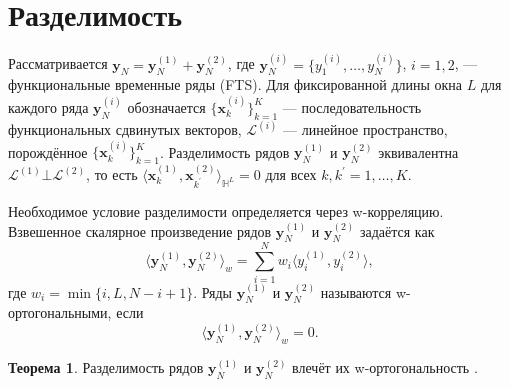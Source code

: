 \documentclass[12pt, specialist, subf
]{disser}
\theoremstyle{definition}
\newtheorem{theorem}{Теорема} %
\begin{document}
\section{Разделимость}\label{subsec: Separability}

Рассматривается $\textbf{y}_N=\textbf{y}_N^{(1)}+\textbf{y}_N^{(2)}$, где $\textbf{y}_N^{(i)}=\{y_1^{(i)},\ldots,y_N^{(i)}\}$, $i=1,2$, — функциональные временные ряды (FTS). Для фиксированной длины окна $L$ для каждого ряда $\textbf{y}_N^{(i)}$ обозначается $\{{\pmb x}_{k}^{(i)}\}_{k=1}^K$ — последовательность функциональных сдвинутых векторов, $\mathcal{L}^{(i)}$ — линейное пространство, порождённое $\{{\pmb x}_{k}^{(i)}\}_{k=1}^K$. Разделимость рядов $\textbf{y}_N^{(1)}$ и $\textbf{y}_N^{(2)}$ эквивалентна $\mathcal{L}^{(1)}\bot\mathcal{L}^{(2)}$, то есть $\langle {\pmb x}_{k}^{(1)},{\pmb x}_{k^\prime}^{(2)}\rangle_{\mathbb{H}^L}=0$ для всех $k,k^\prime=1,\ldots,K$.

Необходимое условие разделимости определяется через w-корреляцию. Взвешенное скалярное произведение рядов $\textbf{y}_N^{(1)}$ и $\textbf{y}_N^{(2)}$ задаётся как
\begin{equation}\label{winn}
	\langle \textbf{y}_N^{(1)},\textbf{y}_N^{(2)}\rangle_w=\sum_{i=1}^N w_i \langle y_i^{(1)},y_i^{(2)}\rangle,
\end{equation}
где $w_i=\min\{i,L,N-i+1\}$. Ряды $\textbf{y}_N^{(1)}$ и $\textbf{y}_N^{(2)}$ называются w-ортогональными, если
\begin{equation}
	\langle \textbf{y}_N^{(1)},\textbf{y}_N^{(2)}\rangle_w=0.
\end{equation}

\begin{theorem}\label{thm:fSep}
	Разделимость рядов $\textbf{y}_N^{(1)}$ и $\textbf{y}_N^{(2)}$ влечёт их w-ортогональность \cite{haghbin2019functionalsingularspectrumanalysis}.
\end{theorem}
\end{document}
